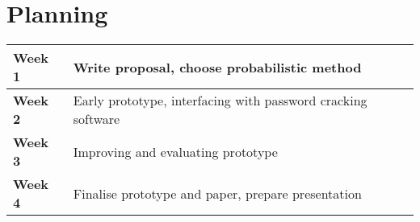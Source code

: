 \documentclass{article}
\begin{document}
\section{Planning}

\begin{tabular}{ | l | l | }
\hline {\bf Week 1} & Write proposal, choose probabilistic method \\
\hline {\bf Week 2} & Early prototype, interfacing with password cracking software \\
\hline {\bf Week 3} & Improving and evaluating prototype \\
\hline {\bf Week 4} & Finalise prototype and paper, prepare presentation \\
\hline
\end{tabular}


\printbibliography
\end{document}
